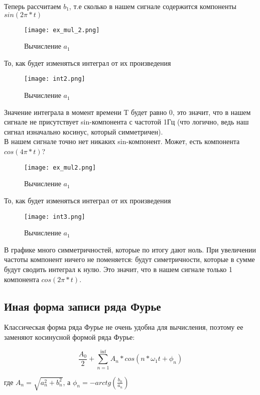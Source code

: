 Теперь рассчитаем $b_1$, т.е сколько в нашем сигнале содержится компоненты $sin(2\pi*t)$

\begin{figure}[H]
    \centering
    \texttt{[image: ex\_mul\_2.png]}
    \caption{Вычисление $a_1$}
\end{figure}

То, как будет изменяться интеграл от их произведения
\begin{figure}[H]
    \centering
    \texttt{[image: int2.png]}
    \caption{Вычисление $a_1$}
\end{figure}

Значение интеграла в момент времени T будет равно 0, это значит, что в нашем
сигнале не присутствует sin-компонента с частотой 1Гц (что логично, ведь наш сигнал изначально косинус, который симметричен). \\

В нашем сигнале точно нет никаких sin-компонент. Может, есть компонента $cos(4\pi*t)$?


\begin{figure}[H]
    \centering
    \texttt{[image: ex\_mul2.png]}
    \caption{Вычисление $a_1$}
\end{figure}

То, как будет изменяться интеграл от их произведения
\begin{figure}[H]
    \centering
    \texttt{[image: int3.png]}
    \caption{Вычисление $a_1$}
\end{figure}

В графике много симметричностей, которые по итогу дают ноль. При увеличении частоты компонент ничего не поменяется: будут симетричности,
которые в сумме будут сводить интеграл к нулю. Это значит, что в нашем сигнале только 1 компонента $cos(2\pi*t)$. \\

\subsection*{\textbf{Иная форма записи ряда Фурье}}

Классическая форма ряда Фурье не очень удобна для вычисления, поэтому ее заменяют косинусной формой ряда Фурье:

$$\frac{A_0}{2}+\sum_{n=1}^{\inf}A_n*cos(n*\omega_1t+\phi_n)$$

где $A_n = \sqrt{a_n^2+b_n^2}$, а $\phi_n = -arctg(\frac{b_n}{a_n})$

